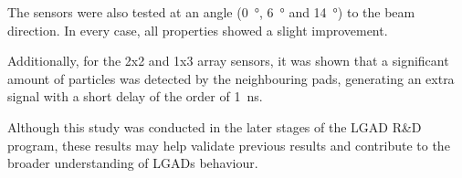 The sensors were also tested at an angle (\qty{0}{\degree}, \qty{6}{\degree} and \qty{14}{\degree}) to the beam direction. In every case, all properties showed a slight improvement. 

Additionally, for the 2x2 and 1x3 array sensors, it was shown that a significant amount of particles was detected by the neighbouring pads, generating an extra signal with a short delay of the order of \qty{1}{\nano\second}.

Although this study was conducted in the later stages of the LGAD R\&D program, these results may help validate previous results and contribute to the broader understanding of LGADs behaviour.
